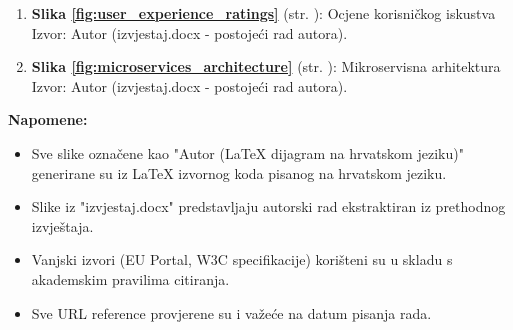 \begin{enumerate}
\item \textbf{Slika \ref{fig:user_experience_ratings}} (str. \pageref{fig:user_experience_ratings}): Ocjene korisničkog iskustva \\
Izvor: Autor (izvjestaj.docx - postojeći rad autora).

\item \textbf{Slika \ref{fig:microservices_architecture}} (str. \pageref{fig:microservices_architecture}): Mikroservisna arhitektura \\
Izvor: Autor (izvjestaj.docx - postojeći rad autora).

\end{enumerate}

\vspace{1cm}

\textbf{Napomene:}
\begin{itemize}
    \item Sve slike označene kao "Autor (LaTeX dijagram na hrvatskom jeziku)" generirane su iz LaTeX izvornog koda pisanog na hrvatskom jeziku.
    \item Slike iz "izvjestaj.docx" predstavljaju autorski rad ekstraktiran iz prethodnog izvještaja.
    \item Vanjski izvori (EU Portal, W3C specifikacije) korišteni su u skladu s akademskim pravilima citiranja.
    \item Sve URL reference provjerene su i važeće na datum pisanja rada.
\end{itemize} 